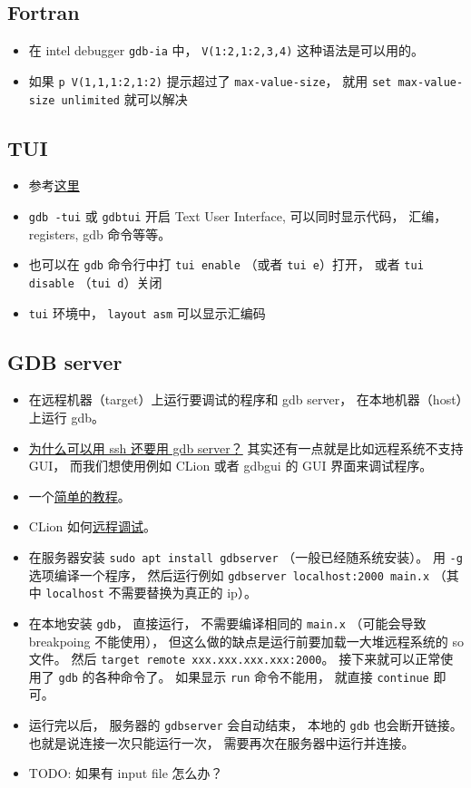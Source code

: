 \subsection{Fortran}
\begin{itemize}
\item 在 intel debugger \verb`gdb-ia` 中， \verb`V(1:2,1:2,3,4)` 这种语法是可以用的。
\item 如果 \verb`p V(1,1,1:2,1:2)` 提示超过了 \verb`max-value-size`， 就用 \verb`set max-value-size unlimited` 就可以解决
\end{itemize}

\subsection{TUI}
\begin{itemize}
\item 参考\href{https://developer.apple.com/library/archive/documentation/DeveloperTools/gdb/gdb/gdb_toc.html#TOC229}{这里}
\item \verb`gdb -tui` 或 \verb`gdbtui` 开启 Text User Interface, 可以同时显示代码， 汇编， registers, gdb 命令等等。
\item 也可以在 \verb`gdb` 命令行中打 \verb`tui enable` （或者 \verb`tui e`）打开， 或者 \verb`tui disable` （\verb`tui d`）关闭
\item \verb`tui` 环境中， \verb`layout asm` 可以显示汇编码
\end{itemize}


\subsection{GDB server}
\begin{itemize}
\item 在远程机器（target）上运行要调试的程序和 gdb server， 在本地机器（host）上运行 gdb。
\item \href{https://stackoverflow.com/questions/69176457/the-difference-between-gdbserver-and-remote-gdb}{为什么可以用 ssh 还要用 gdb server？} 其实还有一点就是比如远程系统不支持 GUI， 而我们想使用例如 CLion 或者 gdbgui 的 GUI 界面来调试程序。
\item 一个\href{https://www.thegeekstuff.com/2014/04/gdbserver-example/}{简单的教程}。
\item CLion 如何\href{https://www.jetbrains.com/help/clion/remote-debug.html}{远程调试}。
\item 在服务器安装 \verb`sudo apt install gdbserver` （一般已经随系统安装）。 用 \verb`-g` 选项编译一个程序， 然后运行例如 \verb`gdbserver localhost:2000 main.x` （其中 \verb`localhost` 不需要替换为真正的 ip）。
\item 在本地安装 \verb`gdb`， 直接运行， 不需要编译相同的 \verb`main.x` （可能会导致 breakpoing 不能使用）， 但这么做的缺点是运行前要加载一大堆远程系统的 so 文件。 然后 \verb`target remote xxx.xxx.xxx.xxx:2000`。 接下来就可以正常使用了 \verb`gdb` 的各种命令了。 如果显示 \verb`run` 命令不能用， 就直接 \verb`continue` 即可。
\item 运行完以后， 服务器的 \verb`gdbserver` 会自动结束， 本地的 \verb`gdb` 也会断开链接。 也就是说连接一次只能运行一次， 需要再次在服务器中运行并连接。
\item TODO: 如果有 input file 怎么办？
\end{itemize}
